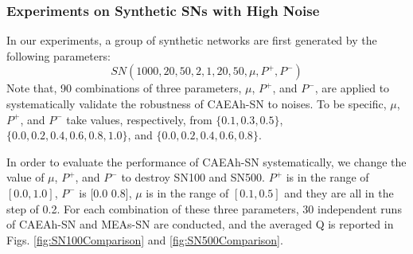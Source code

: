 \documentclass[10pt, journal]{IEEEtran}
\begin{document}
\subsubsection{Experiments on Synthetic SNs with High Noise}\label{section:experiment:synthetic:Dynamicresults}



In our experiments, a group of synthetic networks are first generated by the following parameters:
\begin{equation}\label{eqn:SRN1000}
SN(1000,20,50,2,1,20,50,\mu,P^+,P^-) 
\end{equation}
Note that, 90 combinations of three parameters, $\mu$, $P^+$, and $P^-$, are applied to systematically validate the robustness of CAEAh-SN
to  noises. To be specific, $\mu$, $P^+$, and $P^-$ take values, respectively, from $\{0.1,0.3,0.5\}$, $\{0.0,0.2,0.4,0.6,0.8,1.0\}$, and $\{0.0,0.2,0.4,0.6,0.8\}$.


In order to evaluate the performance of CAEAh-SN systematically, we change the value of $\mu$, $P^+$, and $P^-$ to destroy SN100 and SN500. $P^+$ is in the range of $[0.0,1.0]$, $P^-$ is [0.0 0.8], $\mu$ is in the range of $[0.1,0.5]$ and they are all in the step of 0.2. For each combination of these three parameters, 30 independent runs of CAEAh-SN and MEAs-SN are conducted, and the averaged Q is reported in Figs. \ref{fig:SN100Comparison} and \ref{fig:SN500Comparison}.
\end{document}

